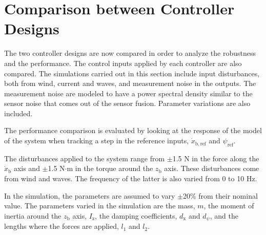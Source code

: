 \section{Comparison between Controller Designs}\label{sec:comparison}
The two controller designs are now compared in order to analyze the robustness and the performance. The control inputs applied by each controller are also compared. The simulations carried out in this section include input disturbances, both from wind, current and waves, and measurement noise in the outputs. The measurement noise are modeled to have a power spectral density similar to the sensor noise that comes out of the sensor fusion. Parameter variations are also included.

The performance comparison is evaluated by looking at the response of the model of the system when tracking a step in the reference inputs, $\dot{x}_\mathrm{b,ref}$ and $\psi_\mathrm{ref}$. 

The disturbances applied to the system range from $\pm$\num{1.5} N in the force along the $\dot{x}_\mathrm{b}$ axis and $\pm$\num{1.5} N$\cdot$m in the torque around the $z_\mathrm{b}$ axis. These disturbances come from wind and waves. The frequency of the latter is also varied from 0 to 10 Hz.

In the simulation, the parameters are assumed to vary $\pm$20\% from their nominal value. The parameters varied in the simulation are the mass, $m$, the moment of inertia around the $z_\mathrm{b}$ axis, $I_\mathrm{z}$, the damping coefficients, $d_\mathrm{x}$ and $d_\psi$, and the lengths where the forces are applied, $l_1$ and $l_2$. 

